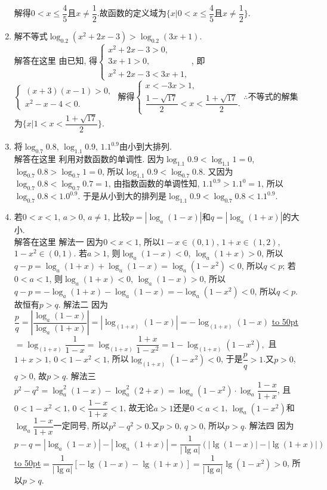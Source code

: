 \documentclass[10pt,a4paper]{article}
\newcommand{\blank}[1]{\underline{\hbox to #1pt{}}}
\begin{document}
\begin{enumerate}[1.]
解得$0<x\le \dfrac 45$且$x\ne \dfrac 12$.故函数的定义域为$\{x|0<x\le \dfrac 45\text{且}x\ne \dfrac 12\}$.
\item 解不等式$\log_{0.2}(x^2+2x-3)>\log_{0.2}(3x+1)$.\\
解答在这里  由已知, 得$\begin{cases} x^2+2x-3>0, \\ 3x+1>0, \\ x^2+2x-3<3x+1, \end{cases}$, 即$\begin{cases} (x+3)(x-1)>0, \\ x^2-x-4<0. \end{cases}$
解得$\begin{cases} x<-3x>1, \\ \dfrac{1-\sqrt {17}}2<x<\dfrac{1+\sqrt {17}}2. \end{cases}\therefore$不等式的解集为$\{x|1<x<\dfrac{1+\sqrt {17}}2\}$.
\item 将$\log_{0.7}0.8$, $\log_{1.1}0.9$, $1.1^{0.9}$由小到大排列.\\
解答在这里  利用对数函数的单调性.
因为$\log_{1.1}0.9<\log_{1.1}1=0$, $\log_{0.7}0.8>\log_{0.7}1=0$, 所以$\log_{1.1}0.9<\log_{0.7}0.8$.
又因为$\log_{0.7}0.8<\log_{0.7}0.7=1$, 由指数函数的单调性知, $1.1^{0.9}>1.1^0=1$, 所以$\log_{0.7}0.8<1.0^{0.9}$.
于是从小到大的排列是$\log_{1.1}0.9<\log_{0.7}0.8<1.1^{0.9}$.
\item 若$0<x<1$, $a>0$, $a\ne 1$, 比较$p=|\log_a(1-x)|$和$q=|\log_a(1+x)|$的大小.\\
解答在这里 解法一  因为$ 0<x<1$, 所以$ 1-x\in (0,1)$, $1+x\in (1,2)$, $1-x^2\in (0,1)$.
若$a>1$, 则$\log_a(1-x)<0$, $\log_a(1+x)>0$,
所以$ q-p=\log_a(1+x)+\log_a(1-x)=\log_a(1-x^2)<0$, 所以$ q<p$;
若$0<a<1$, 则$\log_a(1+x)<0$, $\log_a(1-x)>0$,
所以$ q-p=-\log_a(1+x)-\log_a(1-x)=-\log_a(1-x^2)<0$, 所以$ q<p$.故恒有$p>q$.
解法二  因为$ \dfrac pq=|\dfrac{\log_a(1-x)}{\log_a(1+x)}|=|\log_{(1+x)}(1-x)|=-\log_{(1+x)}(1-x)$
\blank{50}$=\log_{(1+x)}\dfrac 1{1-x}=\log_{(1+x)}\dfrac{1+x}{1-x^2}=1-\log_{(1+x)}(1-x^2),$
且$1+x>1$, $0<1-x^2<1$, 所以$ \log_{(1+x)}(1-x^2)<0$, 于是$\dfrac pq>1$.又$p>0$, $q>0$, 故$p>q$.
解法三  $p^2-q^2=\log_a^2(1-x)-\log_a^2(2+x)=\log_a(1-x^2)\cdot \log_a\dfrac{1-x}{1+x}$,
且$0<1-x^2<1$, $0<\dfrac{1-x}{1+x}<1$, 故无论$a>1$还是$0<a<1$, $\log_a(1-x^2)$和$\log_a\dfrac{1-x}{1+x}$一定同号, 所以$ p^2-q^2>0$.又$p>0$, $q>0$, 所以$ p>q$.
解法四  因为$ p-q=|\log_a(1-x)|-|\log_a(1+x)|=\dfrac 1{|\lg a|}(|\lg (1-x)|-|\lg (1+x)|)$
\blank{50}$=\dfrac 1{|\lg a|}[-\lg (1-x)-\lg (1+x)]=\dfrac 1{|\lg a|}\lg (1-x^2)>0$,
所以$ p>q$.

\end{enumerate}
\end{document}
